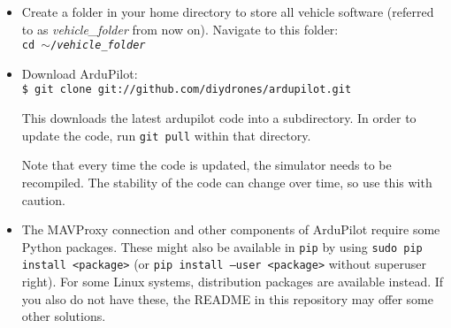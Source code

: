 \documentclass{article}
\begin{document}
\begin{itemize}
    \item Create a folder in your home directory to store all vehicle software 
          (referred to as \emph{vehicle\_folder} from now on). Navigate to this 
          folder: \\
          {\tt cd $\sim$/\emph{vehicle\_folder}}
    \item Download ArduPilot: \\
          {\tt \$ git clone git://github.com/diydrones/ardupilot.git}

          This downloads the latest ardupilot code into a subdirectory. In 
          order to update the code, run {\tt git pull} within that directory.

          Note that every time the code is updated, the simulator needs to be 
          recompiled. The stability of the code can change over time, so use 
          this with caution.
    \item The MAVProxy connection and other components of ArduPilot require 
          some Python packages. These might also be available in {\tt pip} by 
          using {\tt sudo pip install <package>} (or {\tt pip install --user 
          <package>} without superuser right). For some Linux systems,
          distribution packages are available instead. If you also do not have 
          these, the README in this repository may offer some other solutions.
          

\end{itemize}
\end{document}
